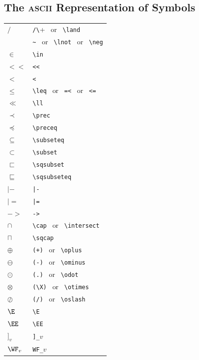 \documentclass[fleqn,leqno]{article}
\begin{document}
\subsection*{The {\rm\textsc{ascii}} Representation of Symbols}


\noindent
\begin{tabular}[t]{@{}ll@{}}
$/\ $ & \verb+/\+ \ {\small or} \ \verb+\land+ \\
$~$ & \verb+~+ \ {\small or} \ \verb+\lnot+ \ {\small or} \ \verb+\neg+ \\
$\in$ & \verb+\in+ \\
$<<$ & \verb+<<+ \\
$<$ & \verb+<+ \\
$\leq$ & \verb+\leq+ \ {\small or} \ \verb+=<+ \ {\small or} \ \verb+<=+ \\
$\ll$ & \verb+\ll+ \\
$\prec$ & \verb+\prec+ \\
$\preceq$ & \verb+\preceq+ \\
$\subseteq$ & \verb+\subseteq+ \\
$\subset$ & \verb+\subset+ \\
$\sqsubset$ & \verb+\sqsubset+ \\
$\sqsubseteq$ & \verb+\sqsubseteq+ \\
$|-$ & \verb+|-+ \\
$|=$ & \verb+|=+ \\
$->$ & \verb+->+ \\
$\cap$ & \verb+\cap+ \ {\small or} \ \verb+\intersect+ \\
$\sqcap$ & \verb+\sqcap+ \\
$\oplus$ & \verb|(+)| \ {\small or} \ \verb+\oplus+ \\
$\ominus$ & \verb+(-)+ \ {\small or} \ \verb+\ominus+ \\
$\odot$ & \verb+(.)+ \ {\small or} \ \verb+\odot+ \\
$\otimes$ & \verb|(\X)| \ {\small or} \ \verb+\otimes+ \\
$\oslash$ & \verb+(/)+ \ {\small or} \ \verb+\oslash+ \\
$\E$ & \verb|\E| \\
$\EE$ & \verb|\EE|\\
$]_v$ & \verb|]_|$v$\\
$\WF_v$ & \verb|WF_|$v$
\end{tabular}%
\end{document}

